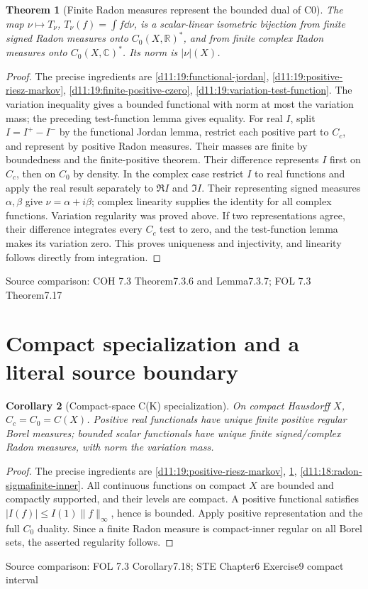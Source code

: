 \documentclass[11pt,oneside,openany]{book}
\newtheorem{theorem}{Theorem}[chapter]
\newtheorem{corollary}[theorem]{Corollary}
\theoremstyle{definition}
\theoremstyle{remark}
\newcommand{\R}{\mathbb R}\newcommand{\C}{\mathbb C}
\newcommand{\family}[1]{}
\newcommand{\source}[1]{\par\begingroup\small\sffamily\color{black!65}Source comparison: #1\par\endgroup}
\begin{document}
\begin{theorem}[Finite Radon measures represent the bounded dual of C0]\family{D11.19.czero_duality}\label{d11:19:czero-duality}
The map $\nu\mapsto T_\nu$, $T_\nu(f)=\int f\dd\nu$, is a scalar-linear isometric bijection from finite signed Radon measures onto $C_0(X,\R)^*$, and from finite complex Radon measures onto $C_0(X,\C)^*$. Its norm is $|\nu|(X)$.
\end{theorem}
\begin{proof}
The precise ingredients are \cref{d11:19:functional-jordan}, \cref{d11:19:positive-riesz-markov}, \cref{d11:19:finite-positive-czero}, \cref{d11:19:variation-test-function}. The variation inequality gives a bounded functional with norm at most the variation mass; the preceding test-function lemma gives equality. For real $I$, split $I=I^+-I^-$ by the functional Jordan lemma, restrict each positive part to $C_c$, and represent by positive Radon measures. Their masses are finite by boundedness and the finite-positive theorem. Their difference represents $I$ first on $C_c$, then on $C_0$ by density. In the complex case restrict $I$ to real functions and apply the real result separately to $\Re I$ and $\Im I$. Their representing signed measures $\alpha,\beta$ give $\nu=\alpha+i\beta$; complex linearity supplies the identity for all complex functions. Variation regularity was proved above. If two representations agree, their difference integrates every $C_c$ test to zero, and the test-function lemma makes its variation zero. This proves uniqueness and injectivity, and linearity follows directly from integration.
\end{proof}
\source{COH 7.3 Theorem7.3.6 and Lemma7.3.7; FOL 7.3 Theorem7.17}

\section{Compact specialization and a literal source boundary}

\begin{corollary}[Compact-space C(K) specialization]\family{D11.19.compact_representation}\label{d11:19:compact-representation}
On compact Hausdorff $X$, $C_c=C_0=C(X)$. Positive real functionals have unique finite positive regular Borel measures; bounded scalar functionals have unique finite signed/complex Radon measures, with norm the variation mass.
\end{corollary}
\begin{proof}
The precise ingredients are \cref{d11:19:positive-riesz-markov}, \cref{d11:19:czero-duality}, \cref{d11:18:radon-sigmafinite-inner}. All continuous functions on compact $X$ are bounded and compactly supported, and their levels are compact. A positive functional satisfies $|I(f)|\le I(1)\|f\|_\infty$, hence is bounded. Apply positive representation and the full $C_0$ duality. Since a finite Radon measure is compact-inner regular on all Borel sets, the asserted regularity follows.
\end{proof}
\source{FOL 7.3 Corollary7.18; STE Chapter6 Exercise9 compact interval}
\end{document}
